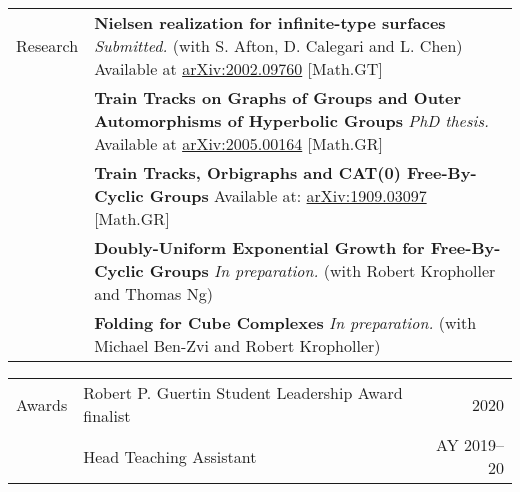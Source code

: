 \documentclass[10pt,letterpaper]{article}
\begin{document}
\begin{tabularx}{\textwidth}{HX}
	Research 
	& 
	\textbf{Nielsen realization for infinite-type surfaces}
	\newline\hspace*{2pc}
	\emph{Submitted.} (with S. Afton, D. Calegari and L. Chen)
	\newline\hspace*{2pc}
	Available at \href{https://arxiv.org/abs/2002.09760}{arXiv:2002.09760} 
	[Math.GT] \\
	&
	\textbf{Train Tracks on Graphs of Groups and Outer Automorphisms of Hyperbolic Groups}
	\newline\hspace*{2pc}
	\emph{PhD thesis.} 
	Available at \href{https://arxiv.org/abs/2005.00164}{arXiv:2005.00164} 
	[Math.GR] \\
	&
	\textbf{Train Tracks, Orbigraphs and CAT(0) Free-By-Cyclic Groups}
	\newline\hspace*{2pc} 
	Available at: \href{https://arxiv.org/abs/1909.03097}{arXiv:1909.03097} 
	[Math.GR] \\
	& 
	\textbf{Doubly-Uniform Exponential Growth for Free-By-Cyclic Groups}
	\newline\hspace*{2pc} \emph{In preparation.} 
	(with Robert Kropholler and Thomas Ng) \\
	&
	\textbf{Folding for Cube Complexes}
	\newline\hspace*{2pc} \emph{In preparation.} 
	(with Michael Ben-Zvi and Robert Kropholler) \\
\end{tabularx}

\begin{tabularx}{\textwidth}{HXr}
	Awards
	& Robert P. Guertin Student Leadership Award finalist & 2020 \\
	& Head Teaching Assistant & AY 2019--20 \\
\end{tabularx}
\end{document}
